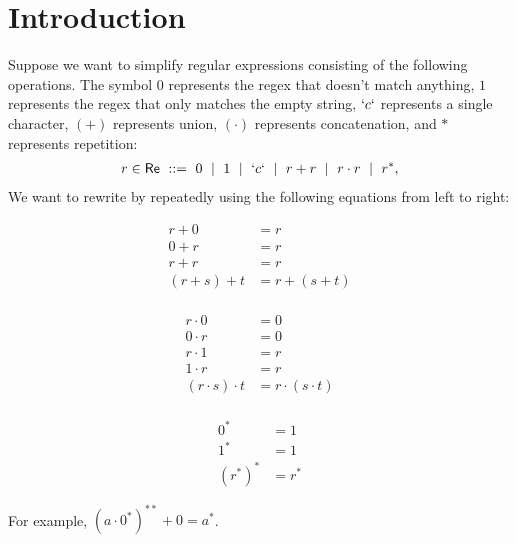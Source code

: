 \newpage
\section{Introduction}

\newcommand{\emp}{0}
\newcommand{\eps}{1}
\newcommand{\seq}{\cdot}
\newcommand{\md}{\ \mid \ }

Suppose we want to simplify regular expressions consisting of the following operations.
The symbol $0$ represents the regex that doesn't match anything, $1$ represents the regex that only matches the empty string,
$`c`$ represents a single character, $(+)$ represents union, $(\cdot)$ represents concatenation, and $*$ represents repetition:
\begin{align*}
  r \in \mathsf{Re} \ ::=\  \emp \md \eps \md `c` \md r + r \md r \seq r \md r^*,
\end{align*}
We want to rewrite by repeatedly using the following equations from left to right: \vspace{-0.7cm}

\begin{minipage}[t]{0.3\textwidth}
  \begin{align*}
    r + \emp &= r \\
    \emp + r &= r \\
    r + r &= r \\
    (r + s) + t &= r + (s + t) \\
  \end{align*}
\end{minipage}
\begin{minipage}[t]{0.3\textwidth}
  \begin{align*}
    r \seq \emp &= \emp \\
    \emp \seq r &= \emp \\
    r \seq \eps &= r \\
    \eps \seq r &= r \\
    (r \seq s) \seq t &= r \seq (s \seq t) \\
  \end{align*}
\end{minipage}
\begin{minipage}[t]{0.3\textwidth}
  \begin{align*}
    \emp^* &= \eps \\
    \eps^* &= \eps \\
    (r^*)^* &= r^*
  \end{align*}
\end{minipage}

For example, $(a \seq 0^*)^{**} + 0 = a^*$.

